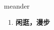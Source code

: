 
\begin{frame}
{\huge meander}
\begin{center}
\begin{enumerate}\Large
  \item \textbf{闲逛，漫步}
\end{enumerate}
\end{center}
\end{frame}
